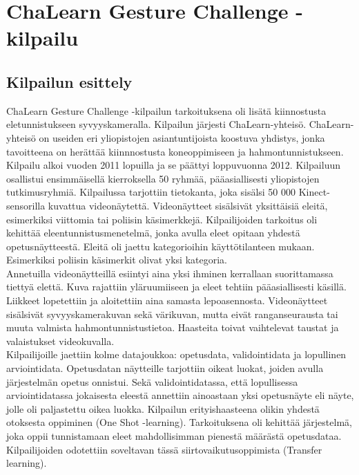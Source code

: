 \section{ChaLearn Gesture Challenge -kilpailu}
\label{ChaLearn Gesture Challenge -kilpailu}

\subsection{Kilpailun esittely}
ChaLearn Gesture Challenge -kilpailun tarkoituksena oli lisätä kiinnostusta eletunnistukseen syvyyskameralla.
Kilpailun järjesti ChaLearn-yhteisö. ChaLearn-yhteisö on useiden eri yliopistojen asiantuntijoista koostuva yhdistys,
jonka tavoitteena on herättää kiinnnostusta koneoppimiseen ja hahmontunnistukseen.\citep{kilpailunnettisivut} Kilpailu alkoi vuoden 2011 lopuilla ja se päättyi loppuvuonna 2012. Kilpailuun osallistui ensimmäisellä kierroksella 50 ryhmää,
pääasiallisesti yliopistojen tutkimusryhmiä. Kilpailussa tarjottiin tietokanta, joka sisälsi 50 000 Kinect-sensorilla kuvattua videonäytettä. 
Videonäytteet sisälsivät yksittäisiä eleitä, esimerkiksi viittomia tai poliisin käsimerkkejä. Kilpailijoiden tarkoitus oli kehittää eleentunnistusmenetelmä, 
jonka avulla eleet opitaan yhdestä opetusnäytteestä. Eleitä oli jaettu kategorioihin käyttötilanteen mukaan. Esimerkiksi poliisin käsimerkit olivat yksi kategoria.
\citep{6239178} \\

Annetuilla videonäytteillä esiintyi aina yksi ihminen kerrallaan suorittamassa tiettyä elettä. Kuva rajattiin yläruumiiseen ja eleet tehtiin
pääasiallisesti käsillä. Liikkeet lopetettiin ja aloitettiin aina samasta lepoasennosta. Videonäytteet sisälsivät syvyyskamerakuvan sekä värikuvan, 
mutta eivät ranganseurausta tai muuta valmista hahmontunnistustietoa. Haasteita toivat vaihtelevat taustat ja valaistukset videokuvalla.  \citep{6239178}\\

Kilpailijoille jaettiin kolme datajoukkoa: opetusdata, validointidata ja lopullinen arviointidata. 
Opetusdatan näytteille tarjottiin oikeat luokat, joiden avulla järjestelmän opetus onnistui.
Sekä validointidatassa, että lopullisessa arviointidatassa jokaisesta eleestä annettiin ainoastaan yksi opetusnäyte eli näyte,
jolle oli paljastettu oikea luokka. Kilpailun erityishaasteena olikin yhdestä otoksesta oppiminen (One Shot -learning). 
Tarkoituksena oli kehittää järjestelmä, joka oppii tunnistamaan eleet mahdollisimman pienestä määrästä opetusdataa. 
Kilpailijoiden odotettiin soveltavan tässä siirtovaikutusoppimista (Transfer learning). \citep{6239178} \\

